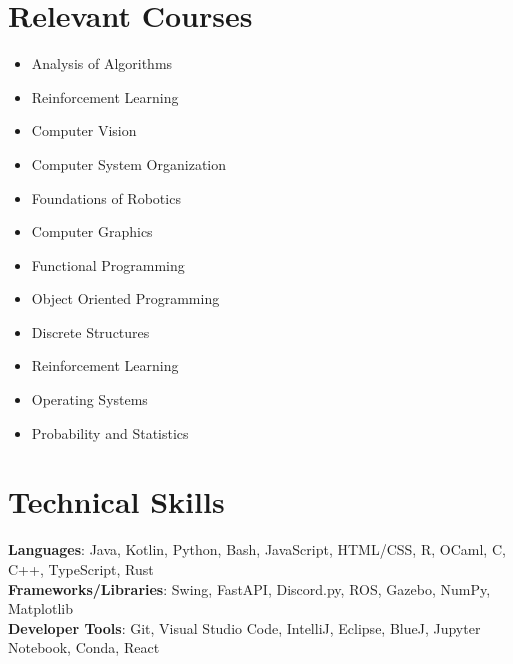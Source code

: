 \documentclass[letterpaper,11pt]{article}
\begin{document}
\section{Relevant Courses}
\begin{multicols}{3}\small
  \begin{itemize}[noitemsep,topsep=0pt,parsep=0pt,partopsep=0pt]
    \item Analysis of Algorithms
    \item Reinforcement Learning
    \item Computer Vision
    \item Computer System Organization
    \item Foundations of Robotics
    \item Computer Graphics
    \item Functional Programming
    \item Object Oriented Programming
    \item Discrete Structures
    \item Reinforcement Learning
    \item Operating Systems
    \item Probability and Statistics
  \end{itemize}\normalsize
\end{multicols}




%
\section{Technical Skills}
\begin{itemize}[leftmargin=0.15in, label={}]
  \small{\item{
                \textbf{Languages}{: Java, Kotlin, Python, Bash, JavaScript, HTML/CSS, R, OCaml, C, C++, TypeScript, Rust} \\
                \textbf{Frameworks/Libraries}{: Swing, FastAPI, Discord.py, ROS, Gazebo, NumPy, Matplotlib} \\
                \textbf{Developer Tools}{: Git, Visual Studio Code, IntelliJ, Eclipse, BlueJ, Jupyter Notebook, Conda, React}
          }}
\end{itemize}


\end{document}
